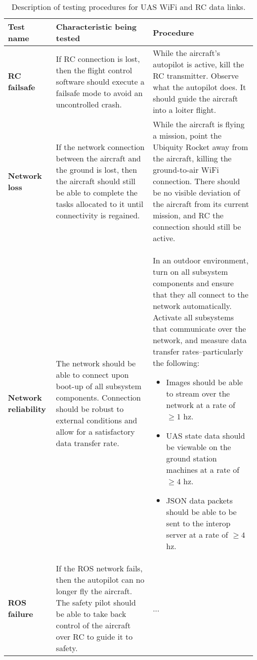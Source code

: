 \documentclass[]{auvsi_doc}
\begin{document}
\begin{center}
	\begin{longtable}[H]{|P{3cm}|P{5.75cm}|P{5.75cm}|}
		\caption{Description of testing procedures for UAS WiFi and RC data links.}
		\label{tab:sstests}\\
		\hline
		{\color[HTML]{000000} \textbf{Test name}} & {\color[HTML]{000000}\textbf{Characteristic being tested}}	& {\color[HTML]{000000}\textbf{Procedure}} \\
		\hline
		\textbf{RC failsafe}	& If RC connection is lost, then the flight control software should execute a failsafe mode to avoid an uncontrolled crash. &	While the aircraft's autopilot is active, kill the RC transmitter. Observe what the autopilot does. It should guide the aircraft into a loiter flight. \\
		\hline
		\textbf{Network loss}	& If the network connection between the aircraft and the ground is lost, then the aircraft should still be able to complete the tasks allocated to it until connectivity is regained. &	While the aircraft is flying a mission, point the Ubiquity Rocket away from the aircraft, killing the ground-to-air WiFi connection. There should be no visible deviation of the aircraft from its current mission, and RC the connection should still be active. \\
		\hline
		\textbf{Network reliability}	& The network should be able to connect upon boot-up of all subsystem components. Connection should be robust to external conditions and allow for a satisfactory data transfer rate. &	In an outdoor environment, turn on all subsystem components and ensure that they all connect to the network automatically. Activate all subsystems that communicate over the network, and measure data transfer rates--particularly the following: \begin{itemize}
			\item Images should be able to stream over the network at a rate of $\geq 1$ hz.
			\item UAS state data should be viewable on the ground station machines at a rate of  $\geq 4$ hz.
			\item JSON data packets should be able to be sent to the interop server at a rate of $\geq 4$ hz.
		\end{itemize} \\
		\hline
		\textbf{ROS failure}	& If the ROS network fails, then the autopilot can no longer fly the aircraft. The safety pilot should be able to take back control of the aircraft over RC to guide it to safety. &	... \\
		\hline
	\end{longtable}
\end{center}
\end{document}
